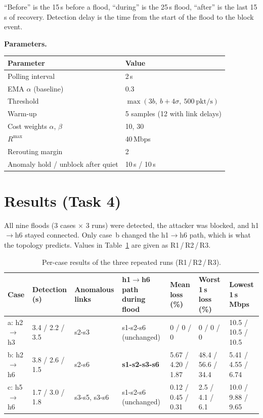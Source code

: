 \documentclass[11pt,a4paper]{article}
\newcommand{\ra}{\ensuremath{\rightarrow}}
\newcommand{\tabref}[1]{Table~\ref{#1}}
\begin{document}
``Before'' is the 15\,s before a flood, ``during'' is the 25\,s flood, ``after'' is the last 15\,s of recovery.
Detection delay is the time from the start of the flood to the block event.

\noindent\textbf{Parameters.}\par
\begin{table}[H]
  \centering
  \small
  \begin{tabular}{ll}
    \toprule
    Parameter & Value \\
    \midrule
    Polling interval & 2\,s \\
    EMA $\alpha$ (baseline) & 0.3 \\
    Threshold & $\max(3b,\ b+4\sigma,\ 500\ \text{pkt/s})$ \\
    Warm-up & 5 samples (12 with link delays) \\
    Cost weights $\alpha$, $\beta$ & 10, 30 \\
    $R^{\max}$ & 40\,Mbps \\
    Rerouting margin & 2 \\
    Anomaly hold / unblock after quiet & 10\,s / 10\,s \\
    \bottomrule
  \end{tabular}
\end{table}

\section{Results (Task 4)}

All nine floods (3 cases $\times$ 3 runs) were detected, the attacker was blocked, and h1\ra h6 stayed
connected. Only case~b changed the h1\ra h6 path, which is what the topology predicts. Values in
\tabref{tab:results} are given as R1\,/\,R2\,/\,R3.

\begin{table}[!htb]
  \centering
  \small
  \caption{Per-case results of the three repeated runs (R1\,/\,R2\,/\,R3).}
  \label{tab:results}
  \footnotesize
  \setlength{\tabcolsep}{4pt}
  \begin{tabularx}{\textwidth}{l l l >{\raggedright\arraybackslash}X l l l}
    \toprule
    Case & Detection (s) & Anomalous links & h1\ra h6 path during flood & Mean loss (\%) &
      Worst 1\,s loss (\%) & Lowest 1\,s Mbps \\
    \midrule
    a: h2\ra h3 & 3.4 / 2.2 / 3.5 & s2-s3 & s1-s2-s6 (unchanged) & 0 / 0 / 0 & 0 / 0 / 0 & 10.5 / 10.5 / 10.5 \\
    b: h2\ra h6 & 3.8 / 2.6 / 1.5 & s2-s6 & \textbf{s1-s2-s3-s6} & 5.67 / 4.20 / 1.87 & 48.4 / 56.6 / 34.4 &
      5.41 / 4.55 / 6.74 \\
    c: h5\ra h6 & 1.7 / 3.0 / 1.8 & s3-s5, s3-s6 & s1-s2-s6 (unchanged) & 0.12 / 0.45 / 0.31 &
      2.5 / 4.1 / 6.1 & 10.0 / 9.88 / 9.65 \\
    \bottomrule
  \end{tabularx}
\end{table}
\end{document}
